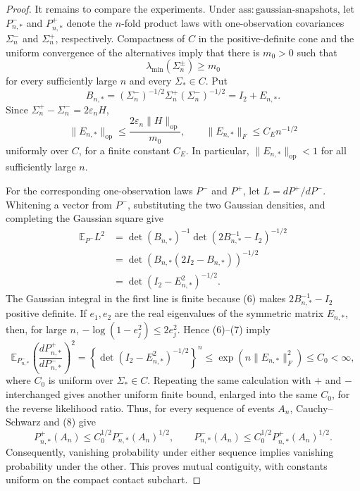 \documentclass{article}
\begin{document}
\begin{proof}
It remains to compare the experiments.  Under \(\mathrm{ass:gaussian\text{-}snapshots}\), let \(P_{n,*}^-\) and \(P_{n,*}^+\) denote the \(n\)-fold product laws with one-observation covariances \(\Sigma_n^-\) and \(\Sigma_n^+\), respectively.  Compactness of \(C\) in the positive-definite cone and the uniform convergence of the alternatives imply that there is \(m_0>0\) such that
\[
 \lambda_{\min}(\Sigma_n^\pm)\ge m_0
\]
for every sufficiently large \(n\) and every \(\Sigma_*\in C\).  Put
\[
 B_{n,*}=(\Sigma_n^-)^{-1/2}\Sigma_n^+(\Sigma_n^-)^{-1/2}
 =I_2+E_{n,*}.
\]
Since \(\Sigma_n^+-\Sigma_n^-=2\varepsilon_nH\),
\[
 \|E_{n,*}\|_{\mathrm{op}}
 \le \frac{2\varepsilon_n\|H\|_{\mathrm{op}}}{m_0},
 \qquad
 \|E_{n,*}\|_F\le C_E n^{-1/2} \tag{6}
\]
uniformly over \(C\), for a finite constant \(C_E\).  In particular,
\(\|E_{n,*}\|_{\mathrm{op}}<1\) for all sufficiently large \(n\).

For the corresponding one-observation laws \(P^-\) and \(P^+\), let
\(L=dP^+/dP^-\).  Whitening a vector from \(P^-\), substituting the two Gaussian densities, and completing the Gaussian square give
\[
 \begin{aligned}
 \mathbb E_{P^-}L^2
 &=\det(B_{n,*})^{-1}
   \det(2B_{n,*}^{-1}-I_2)^{-1/2}\\
 &=\det\!\left(B_{n,*}(2I_2-B_{n,*})\right)^{-1/2}\\
 &=\det(I_2-E_{n,*}^2)^{-1/2}. 
 \end{aligned} \tag{7}
\]
The Gaussian integral in the first line is finite because (6) makes
\(2B_{n,*}^{-1}-I_2\) positive definite.  If \(e_1,e_2\) are the real eigenvalues of the symmetric matrix \(E_{n,*}\), then, for large \(n\),
\(-\log(1-e_j^2)\le2e_j^2\).  Hence (6)--(7) imply
\[
 \mathbb E_{P_{n,*}^-}
 \left(\frac{dP_{n,*}^+}{dP_{n,*}^-}\right)^2
 =\left\{\det(I_2-E_{n,*}^2)^{-1/2}\right\}^{n}
 \le \exp\!\left(n\|E_{n,*}\|_F^2\right)
 \le C_0<\infty, \tag{8}
\]
where \(C_0\) is uniform over \(\Sigma_*\in C\).  Repeating the same calculation with \(+\) and \(-\) interchanged gives another uniform finite bound, enlarged into the same \(C_0\), for the reverse likelihood ratio.  Thus, for every sequence of events \(A_n\), Cauchy--Schwarz and (8) give
\[
 P_{n,*}^+(A_n)\le C_0^{1/2}P_{n,*}^-(A_n)^{1/2},
 \qquad
 P_{n,*}^-(A_n)\le C_0^{1/2}P_{n,*}^+(A_n)^{1/2}. \tag{9}
\]
Consequently, vanishing probability under either sequence implies vanishing probability under the other.  This proves mutual contiguity, with constants uniform on the compact contact subchart.


\end{proof}
\end{document}
